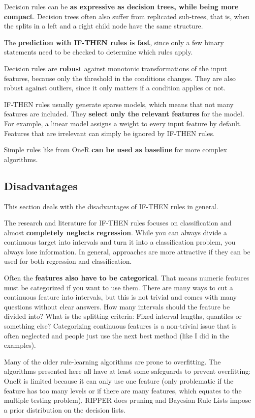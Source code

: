 \documentclass[12pt,]{krantz}
\begin{document}
Decision rules can be \textbf{as expressive as decision trees, while
being more compact}. Decision trees often also suffer from replicated
sub-trees, that is, when the splits in a left and a right child node
have the same structure.

The \textbf{prediction with IF-THEN rules is fast}, since only a few
binary statements need to be checked to determine which rules apply.

Decision rules are \textbf{robust} against monotonic transformations of
the input features, because only the threshold in the conditions
changes. They are also robust against outliers, since it only matters if
a condition applies or not.

IF-THEN rules usually generate sparse models, which means that not many
features are included. They \textbf{select only the relevant features}
for the model. For example, a linear model assigns a weight to every
input feature by default. Features that are irrelevant can simply be
ignored by IF-THEN rules.

Simple rules like from OneR \textbf{can be used as baseline} for more
complex algorithms.

\subsection{Disadvantages}\label{disadvantages-3}

This section deals with the disadvantages of IF-THEN rules in general.

The research and literature for IF-THEN rules focuses on classification
and almost \textbf{completely neglects regression}. While you can always
divide a continuous target into intervals and turn it into a
classification problem, you always lose information. In general,
approaches are more attractive if they can be used for both regression
and classification.

Often the \textbf{features also have to be categorical}. That means
numeric features must be categorized if you want to use them. There are
many ways to cut a continuous feature into intervals, but this is not
trivial and comes with many questions without clear answers. How many
intervals should the feature be divided into? What is the splitting
criteria: Fixed interval lengths, quantiles or something else?
Categorizing continuous features is a non-trivial issue that is often
neglected and people just use the next best method (like I did in the
examples).

Many of the older rule-learning algorithms are prone to overfitting. The
algorithms presented here all have at least some safeguards to prevent
overfitting: OneR is limited because it can only use one feature (only
problematic if the feature has too many levels or if there are many
features, which equates to the multiple testing problem), RIPPER does
pruning and Bayesian Rule Lists impose a prior distribution on the
decision lists.
\end{document}
